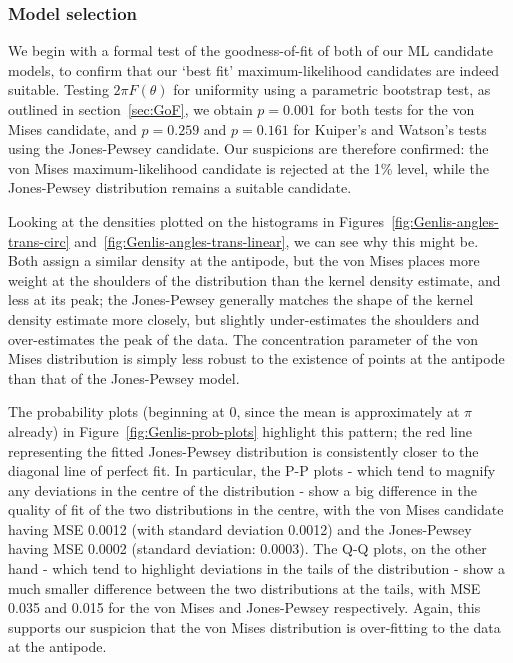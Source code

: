 \documentclass[../../ArchStats.tex]{subfiles}
\begin{document}
\subsubsection{Model selection}
  
We begin with a formal test of the goodness-of-fit of both of our ML candidate models, to confirm that our `best fit' maximum-likelihood candidates are indeed suitable. Testing $2\pi F({\theta})$ for uniformity using a parametric bootstrap test, as outlined in section~\ref{sec:GoF}, we obtain $p = 0.001$ for both tests for the von Mises candidate, and $p = 0.259$ and $p=0.161$ for Kuiper's and Watson's tests using the Jones-Pewsey candidate. Our suspicions are therefore confirmed: the von Mises maximum-likelihood candidate is rejected at the 1\% level, while the Jones-Pewsey distribution remains a suitable candidate.

Looking at the densities plotted on the histograms in Figures~\ref{fig:Genlis-angles-trans-circ} and~\ref{fig:Genlis-angles-trans-linear}, we can see why this might be. Both assign a similar density at the antipode, but the von Mises places more weight at the shoulders of the distribution than the kernel density estimate, and less at its peak; the Jones-Pewsey generally matches the shape of the kernel density estimate more closely, but slightly under-estimates the shoulders and over-estimates the peak of the data. The concentration parameter of the von Mises distribution is simply less robust to the existence of points at the antipode than that of the Jones-Pewsey model.

The probability plots (beginning at 0, since the mean is approximately at $\pi$ already) in Figure~\ref{fig:Genlis-prob-plots} highlight this pattern; the red line representing the fitted Jones-Pewsey distribution is consistently closer to the diagonal line of perfect fit. In particular, the P-P plots - which tend to magnify any deviations in the centre of the distribution - show a big difference in the quality of fit of the two distributions in the centre, with the von Mises candidate having MSE 0.0012 (with standard deviation 0.0012) and the Jones-Pewsey having MSE 0.0002 (standard deviation: 0.0003). The Q-Q plots, on the other hand - which tend to highlight deviations in the tails of the distribution - show a much smaller difference between the two distributions at the tails, with MSE 0.035 and 0.015 for the von Mises and Jones-Pewsey respectively. Again, this supports our suspicion that the von Mises distribution is over-fitting to the data at the antipode.
\end{document}
